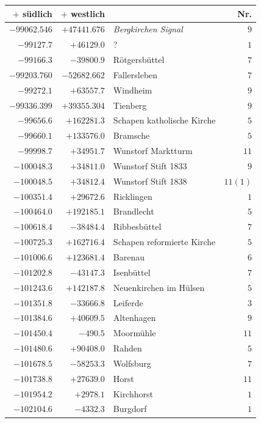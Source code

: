 \clearpage{}%
\begin{center}\begingroup\fontsize{8}{9}\selectfont
\setlength{\tabcolsep}{4pt}
\begin{tabular}{r|r|p{170pt}|r}\hline
\(+\) südlich&\(+\) westlich&&Nr.\\\hline
\(-99062.546\)&\(+47441.676\)&\textit{Bergkirchen Signal}&\(9\)\\
\(-99127.7\)&\(+46129.0\)&?&\(1\)\\
\(-99166.3\)&\(-39800.9\)&Rötgersbüttel&\(7\)\\
\(-99203.760\)&\(-52682.662\)&Fallersleben&\(7\)\\
\(-99272.1\)&\(+63557.7\)&Windheim&\(9\)\\
\(-99336.399\)&\(+39355.304\)&Tienberg&\(9\)\\
\(-99656.6\)&\(+162281.3\)&Schapen katholische Kirche&\(5\)\\
\(-99660.1\)&\(+133576.0\)&Bramsche&\(5\)\\
\(-99998.7\)&\(+34951.7\)&Wunstorf Marktturm&\(11\)\\
\(-100048.3\)&\(+34811.0\)&Wunstorf Stift 1833&\(9\)\\
\(-100048.5\)&\(+34812.4\)&Wunstorf Stift 1838&\(11 (1)\)\\
\(-100351.4\)&\(+29672.6\)&Ricklingen&\(1\)\\
\(-100464.0\)&\(+192185.1\)&Brandlecht&\(5\)\\
\(-100618.4\)&\(-38484.4\)&Ribbesbüttel&\(7\)\\
\(-100725.3\)&\(+162716.4\)&Schapen reformierte Kirche&\(5\)\\
\(-101006.6\)&\(+123681.4\)&Barenau&\(6\)\\
\(-101202.8\)&\(-43147.3\)&Isenbüttel&\(7\)\\
\(-101243.6\)&\(+142187.8\)&Neuenkirchen im Hülsen&\(5\)\\
\(-101351.8\)&\(-33666.8\)&Leiferde&\(3\)\\
\(-101384.6\)&\(+40609.5\)&Altenhagen&\(9\)\\
\(-101450.4\)&\(-490.5\)&Moormühle&\(11\)\\
\(-101480.6\)&\(+90408.0\)&Rahden&\(5\)\\
\(-101678.5\)&\(-58253.3\)&Wolfsburg&\(7\)\\
\(-101738.8\)&\(+27639.0\)&Horst&\(11\)\\
\(-101954.2\)&\(+2978.1\)&Kirchhorst&\(1\)\\
\(-102104.6\)&\(-4332.3\)&Burgdorf&\(1\)\\

\end{tabular}
\end{center}
